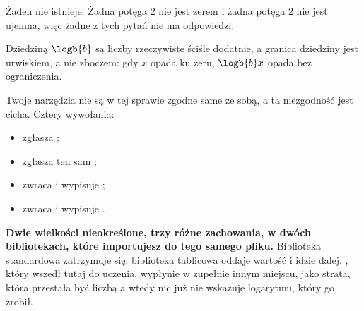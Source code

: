 \begin{fr}
\begin{ansblock}
Żaden nie istnieje. Żadna potęga $2$ nie jest zerem i żadna potęga $2$ nie
jest ujemna, więc żadne z tych pytań nie ma odpowiedzi.

Dziedziną $\logb{b}$ są liczby rzeczywiste ściśle dodatnie, a granica dziedziny
jest urwiskiem, a nie zboczem: gdy $x$ opada ku zeru, $\logb{b} x$ opada bez
ograniczenia.
\end{ansblock}

\begin{warning}
Twoje narzędzia nie są w tej sprawie zgodne same ze sobą, a ta niezgodność jest
cicha. Cztery wywołania:

\begin{itemize}
\item {} zgłasza ;
\item {} zgłasza ten sam ;
\item {} zwraca  i wypisuje
  ;
\item {} zwraca  i wypisuje
  .
\end{itemize}

\textbf{Dwie wielkości nieokreślone, trzy różne zachowania, w dwóch
bibliotekach, które importujesz do tego samego pliku.} Biblioteka standardowa
zatrzymuje się; biblioteka tablicowa oddaje wartość i idzie dalej. ,
który wszedł tutaj do uczenia, wypłynie w zupełnie innym miejscu, jako strata,
która przestała być liczbą \dash{} a wtedy nic już nie wskazuje logarytmu,
który go zrobił.
\end{warning}
\end{fr}

